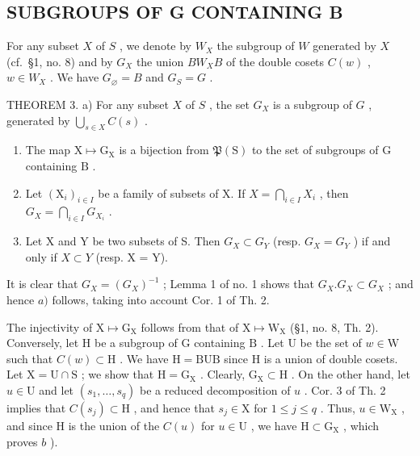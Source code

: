 \subsection{SUBGROUPS OF G CONTAINING B}

For any subset \(X\) of \(S\) , we denote by \(W_X\) the subgroup of \(W\) generated by \(X\) (cf.~§1, no. 8) and by \(G_X\) the union \(BW_X B\) of the double cosets \(C(w)\) , \(w \in W_X\) . We have \(G_\varnothing = B\) and \(G_S = G\) .

THEOREM 3. a) For any subset \(X\) of \(S\) , the set \(G_X\) is a subgroup of \(G\) , generated by \(\bigcup_{s \in X} C(s)\) .

\begin{enumerate}
\def\labelenumi{\alph{enumi})}
\setcounter{enumi}{1}
\item
  The map \(\mathrm{X} \mapsto \mathrm{G}_{\mathrm{X}}\) is a bijection from \(\mathfrak{P}(\mathrm{S})\) to the set of subgroups of \(\mathrm{G}\) containing \(\mathrm{B}\) .
\item
  Let \((\mathrm{X}_i)_{i\in I}\) be a family of subsets of X. If \(X = \bigcap_{i\in I}X_i\) , then \(G_X = \bigcap_{i\in I}G_{X_i}\) .
\item
  Let X and Y be two subsets of S. Then \(G_{X} \subset G_{Y}\) (resp. \(G_{X} = G_{Y}\) ) if and only if \(X \subset Y\) (resp. X = Y).
\end{enumerate}

It is clear that \(G_{X} = (G_{X})^{-1}\) ; Lemma 1 of no. 1 shows that \(G_{X}.G_{X} \subset G_{X}\) ; and hence \(a)\) follows, taking into account Cor. 1 of Th. 2.

The injectivity of \(\mathrm{X} \mapsto \mathrm{G}_{\mathrm{X}}\) follows from that of \(\mathrm{X} \mapsto \mathrm{W}_{\mathrm{X}}\) (§1, no. 8, Th. 2). Conversely, let \(\mathrm{H}\) be a subgroup of \(\mathrm{G}\) containing \(\mathrm{B}\) . Let \(\mathrm{U}\) be the set of \(w \in \mathrm{W}\) such that \(C(w) \subset \mathrm{H}\) . We have \(\mathrm{H} = \mathrm{BUB}\) since \(\mathrm{H}\) is a union of double cosets. Let \(\mathrm{X} = \mathrm{U} \cap \mathrm{S}\) ; we show that \(\mathrm{H} = \mathrm{G}_{\mathrm{X}}\) . Clearly, \(\mathrm{G}_{\mathrm{X}} \subset \mathrm{H}\) . On the other hand, let \(u \in \mathrm{U}\) and let \((s_1, \ldots, s_q)\) be a reduced decomposition of \(u\) . Cor. 3 of Th. 2 implies that \(C(s_j) \subset \mathrm{H}\) , and hence that \(s_j \in \mathrm{X}\) for \(1 \leqslant j \leqslant q\) . Thus, \(u \in \mathrm{W}_{\mathrm{X}}\) , and since \(\mathrm{H}\) is the union of the \(C(u)\) for \(u \in \mathrm{U}\) , we have \(\mathrm{H} \subset \mathrm{G}_{\mathrm{X}}\) , which proves \(b\) ).

